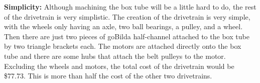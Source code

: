 \par \textbf{Simplicity:} Although machining the box tube will be a little hard to do, the rest of the drivetrain is very simplistic. The creation of the drivetrain is very simple, with the wheels only having an axle, two ball bearings, a pulley, and a wheel. Then there are just two pieces of goBilda half-channel attached to the box tube by two triangle brackets each. The motors are attached directly onto the box tube and there are some hubs that attach the belt pulleys to the motor. Excluding the wheels and motors, the total cost of the drivetrain would be \$77.73. This is more than half the cost of the other two drivetrains. 
\\



